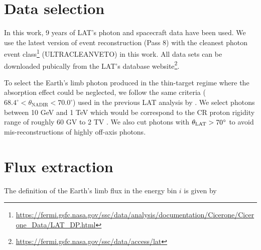 \section{Data selection}
In this work, 9 years of
LAT's photon and spacecraft data have been used.
We use the latest version of event reconstruction (Pass 8) with the
cleanest photon event class\footnote{\url{https://fermi.gsfc.nasa.gov/ssc/data/analysis/documentation/Cicerone/Cicerone_Data/LAT_DP.html}}
(ULTRACLEANVETO) in this work.
All data sets can be downloaded pubically
from the LAT's database website\footnote{\url{https://fermi.gsfc.nasa.gov/ssc/data/access/lat}}.


To select the Earth's limb photon produced in the thin-target regime
where the absorption effect could be neglected, we follow the same
criteria ($68.4^\circ < \theta_\text{NADIR} < 70.0^\circ$)
used in the previous LAT analysis by \cite{FermiEarth14}.
We select photons between 10 GeV and 1 TeV which would be
correspond to the CR proton rigidity range of roughly 60 GV
to 2 TV \citep{FermiEarth14}. We also cut photons with
$\theta_{\rm LAT}>70^\circ$ to avoid mis-reconstructions of
highly off-axis photons.


\section{Flux extraction}

The definition of the Earth's limb flux in the energy bin $i$ is given by

